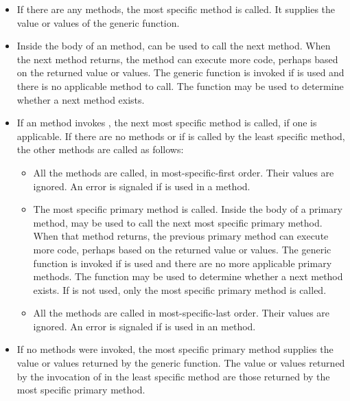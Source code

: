 \begin{itemize}

\item  If there are any  methods, the most specific
 method is called.  It supplies the value or values of the
generic function.

\item  Inside the body of an  method, 
 can be used to call the next method.  When the next
method returns, the  method can execute more code,
perhaps based on the returned value or values.  The generic function
 is invoked if  is used and
there is no applicable method to call.  The function 
 may be used to determine whether a next method exists.

\item  
If an  method invokes , the next
most specific  method is called, if one is applicable.
If there are no  methods or if 
 is called by the least specific 
method, the other methods are called as follows:

\begin{itemize}
\item  All the  methods are called, in
most-specific-first order.  Their values are ignored.
An error is signaled if  is used in a
 method.

\item  The most specific primary method is called.  Inside the
body of a primary method,  may be used to call
the next most specific primary method.  When that method returns, the
previous primary method can execute more code, perhaps based on the
returned value or values.  The generic function 
is invoked if  is used and there are no more
applicable primary methods.  The function  may be
used to determine whether a next method exists.  If 
 is not used, only the most specific primary method
is called.

\item  All the  methods are called in
most-specific-last order.  Their values are ignored.
An error is signaled if  is used in an
 method.
\end{itemize}

\item  If no  methods were invoked, the most
specific primary method supplies the value or values returned by the
generic function.  The value or values returned by the invocation of
 in the least specific  method are
those returned by the most specific primary method.
\end{itemize}

